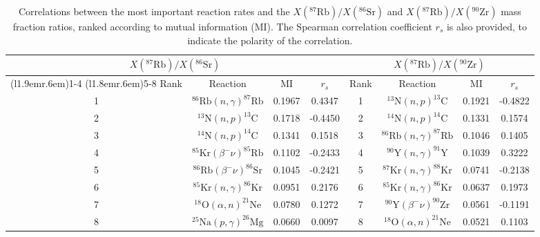 \begin{table}[t]
\centering
\caption{\label{tab:mutual_info}Correlations between the most important reaction rates and the $X(^{87}\mathrm{Rb})/X(^{86}\mathrm{Sr})$ and $X(^{87}\mathrm{Rb})/X(^{90}\mathrm{Zr})$ mass fraction ratios, ranked according to mutual information (MI). The Spearman correlation coefficient $r_{s}$ is also provided, to indicate the polarity of the correlation.}
\begin{tabular}{cccc|cccc}
\hline\midrule
\multicolumn{4}{c}{$X(^{87}\mathrm{Rb})/X(^{86}\mathrm{Sr})$}&
\multicolumn{4}{c}{$X(^{87}\mathrm{Rb})/X(^{90}\mathrm{Zr})$}\\
\cmidrule[0.1pt](l{1.9em}r{.6em}){1-4} \cmidrule[0.1pt](l{1.8em}r{.6em}){5-8}
Rank&Reaction&MI&$r_{s}$&Rank&Reaction&MI&$r_{s}$\\ \midrule
1&$^{86}\mathrm{Rb}(n,\gamma)^{87}\mathrm{Rb}$&0.1967&0.4347
&1&$^{13}\mathrm{N}(n,p)^{13}\mathrm{C}$&0.1921&-0.4822\\
2&$^{13}\mathrm{N}(n,p)^{13}\mathrm{C}$&0.1718&-0.4450
&2&$^{14}\mathrm{N}(n,p)^{14}\mathrm{C}$&0.1331&0.1574\\
3&$^{14}\mathrm{N}(n,p)^{14}\mathrm{C}$&0.1341&0.1518
&3&$^{86}\mathrm{Rb}(n,\gamma)^{87}\mathrm{Rb}$&0.1046&0.1405\\
4&$^{85}\mathrm{Kr}(\beta^{-}\nu)^{85}\mathrm{Rb}$&0.1102&-0.2433
&4&$^{90}\mathrm{Y}(n,\gamma)^{91}\mathrm{Y}$&0.1039&0.3222\\
5&$^{86}\mathrm{Rb}(\beta^{-}\nu)^{86}\mathrm{Sr}$&0.1045&-0.2421
&5&$^{87}\mathrm{Kr}(n,\gamma)^{88}\mathrm{Kr}$&0.0741&-0.2138\\
6&$^{85}\mathrm{Kr}(n,\gamma)^{86}\mathrm{Kr}$&0.0951&0.2176
&6&$^{85}\mathrm{Kr}(n,\gamma)^{86}\mathrm{Kr}$&0.0637&0.1973\\
7&$^{18}\mathrm{O}(\alpha,n)^{21}\mathrm{Ne}$&0.0780&0.1272
&7&$^{90}\mathrm{Y}(\beta^{-}\nu)^{90}\mathrm{Zr}$&0.0561&-0.1191\\
8&$^{25}\mathrm{Na}(p,\gamma)^{26}\mathrm{Mg}$&0.0660&0.0097
&8&$^{18}\mathrm{O}(\alpha,n)^{21}\mathrm{Ne}$&0.0521&0.1103\\
\hline\hline
\end{tabular}
\end{table}

